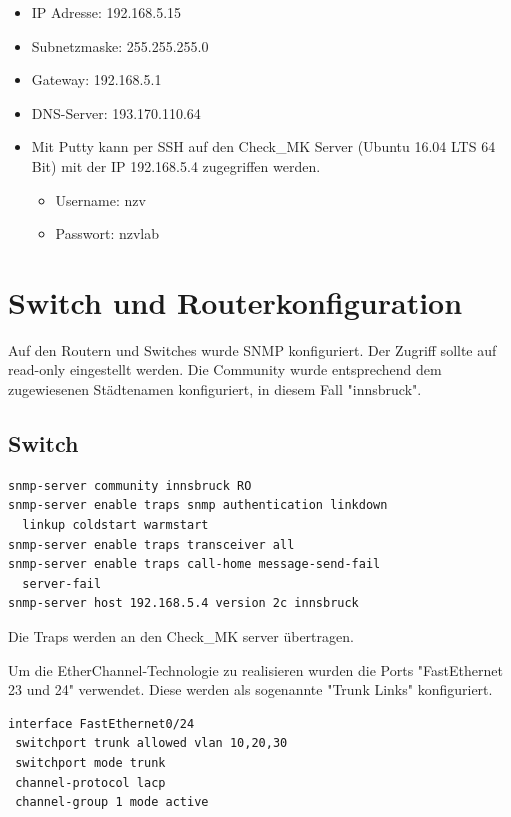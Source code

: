 \begin{itemize}
\item IP Adresse: 192.168.5.15 
\item Subnetzmaske: 255.255.255.0
\item Gateway: 192.168.5.1
\item DNS-Server: 193.170.110.64
\item Mit Putty kann per SSH auf den Check\_MK Server (Ubuntu 16.04 LTS 64 Bit) mit der IP 192.168.5.4 zugegriffen werden.
\begin{itemize}
\item Username: nzv
\item Passwort: nzvlab
\end{itemize}
\end{itemize}

\chapter{Switch und Routerkonfiguration}

Auf den Routern und Switches wurde \ac{SNMP} konfiguriert. Der Zugriff sollte auf read-only eingestellt werden. Die Community wurde entsprechend dem zugewiesenen Städtenamen konfiguriert, in diesem Fall "innsbruck".

\section{Switch}

\begin{lstlisting}[caption={SNMP-Config Switch},label={lst:switch},language={}]
snmp-server community innsbruck RO
snmp-server enable traps snmp authentication linkdown 
  linkup coldstart warmstart
snmp-server enable traps transceiver all
snmp-server enable traps call-home message-send-fail 
  server-fail
snmp-server host 192.168.5.4 version 2c innsbruck
\end{lstlisting}

Die Traps werden an den Check\_MK server übertragen.

Um die EtherChannel-Technologie zu realisieren wurden die Ports "FastEthernet 23 und 24" verwendet. Diese werden als sogenannte "Trunk Links" konfiguriert.

\begin{lstlisting}[caption={Setting EtherChannel on a switch},label={lst:etherchannel},language={}]
interface FastEthernet0/24
 switchport trunk allowed vlan 10,20,30
 switchport mode trunk
 channel-protocol lacp
 channel-group 1 mode active
\end{lstlisting}

